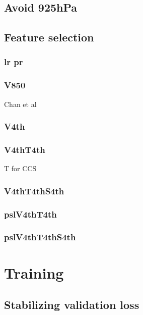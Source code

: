 \subsection{Avoid 925hPa}

\subsection{Feature selection}

\subsubsection{lr pr}

\subsubsection{V850}

Chan et al

\subsubsection{V4th}

\subsubsection{V4thT4th}

T for CCS

\subsubsection{V4thT4thS4th}

\subsubsection{pslV4thT4th}

\subsubsection{pslV4thT4thS4th}


\section{Training}

\subsection{Stabilizing validation loss}

